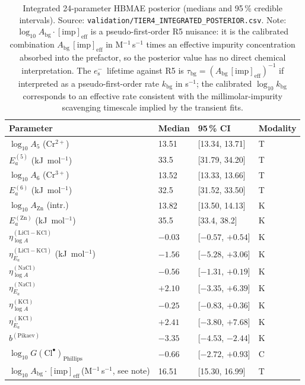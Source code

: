 \documentclass[11pt]{article}
\theoremstyle{plain}
\theoremstyle{definition}
\theoremstyle{remark}
\newcommand{\eS}{\ensuremath{e_{\mathrm{s}}^{-}}\xspace}
\newcommand{\Ea}{E_a}
\begin{document}
\begin{table}[h!]
\centering
\caption{Integrated 24-parameter HBMAE posterior (medians and 95\,\%
credible intervals).  Source: \texttt{validation/TIER4\_INTEGRATED\_POSTERIOR.csv}.
Note: $\log_{10}\!A_{\mathrm{bg}}\!\cdot\![\mathrm{imp}]_{\mathrm{eff}}$
is a pseudo-first-order R5 nuisance: it is the calibrated combination
$A_{\mathrm{bg}}\,[\mathrm{imp}]_{\mathrm{eff}}$ in M$^{-1}$\,s$^{-1}$
times an effective impurity concentration absorbed into the prefactor,
so the posterior value has no direct chemical interpretation.  The
\eS\ lifetime against R5 is $\tau_{\mathrm{bg}} =
(A_{\mathrm{bg}}\,[\mathrm{imp}]_{\mathrm{eff}})^{-1}$ if interpreted as
a pseudo-first-order rate $k_{\mathrm{bg}}$ in s$^{-1}$; the calibrated
$\log_{10}k_{\mathrm{bg}}$ corresponds to an effective rate consistent
with the millimolar-impurity scavenging timescale implied by the
transient fits.}
\label{tab:posterior}
\small
\begin{tabular}{llll}
\toprule
Parameter & Median & 95\,\% CI & Modality \\
\midrule
$\log_{10}\!A_5$ (Cr$^{2+}$)      & 13.51 & [13.34, 13.71] & T \\
$\Ea^{(5)}$  (kJ~mol$^{-1}$)      & 33.5  & [31.79, 34.20] & T \\
$\log_{10}\!A_6$ (Cr$^{3+}$)      & 13.52 & [13.33, 13.66] & T \\
$\Ea^{(6)}$  (kJ~mol$^{-1}$)      & 32.5  & [31.52, 33.50] & T \\
$\log_{10}\!A_{\mathrm{Zn}}$ (intr.)   & 13.82 & [13.50, 14.13] & K \\
$\Ea^{(\mathrm{Zn})}$ (kJ~mol$^{-1}$)  & 35.5  & [33.4, 38.2]   & K \\
$\eta_{\log A}^{(\mathrm{LiCl-KCl})}$  & $-0.03$ & [$-0.57$, $+0.54$] & K \\
$\eta_{\Ea}^{(\mathrm{LiCl-KCl})}$ (kJ~mol$^{-1}$)  & $-1.56$ & [$-5.28$, $+3.06$] & K \\
$\eta_{\log A}^{(\mathrm{NaCl})}$      & $-0.56$ & [$-1.31$, $+0.19$] & K \\
$\eta_{\Ea}^{(\mathrm{NaCl})}$         & $+2.10$  & [$-3.35$, $+6.39$] & K \\
$\eta_{\log A}^{(\mathrm{KCl})}$       & $-0.25$  & [$-0.83$, $+0.36$] & K \\
$\eta_{\Ea}^{(\mathrm{KCl})}$          & $+2.41$  & [$-3.80$, $+7.68$] & K \\
$b^{(\mathrm{Pikaev})}$                & $-3.35$ & [$-4.53$, $-2.44$] & K \\
$\log_{10}\!G(\mathrm{Cl}^{\bullet})_{\mathrm{Phillips}}$ & $-0.66$  & [$-2.72$, $+0.93$] & C \\
$\log_{10}\!A_{\mathrm{bg}}\!\cdot\![\mathrm{imp}]_{\mathrm{eff}}$\,(M$^{-1}$\,s$^{-1}$, see note)        & 16.51 & [15.30, 16.99]     & T \\
\bottomrule
\end{tabular}
\end{table}
\end{document}
